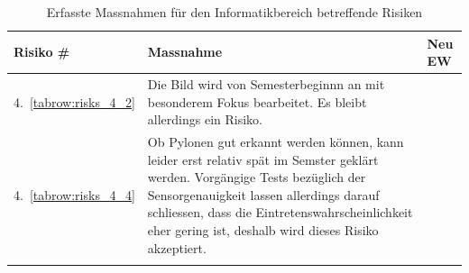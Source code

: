 \documentclass[main.tex]{subfiles} %
\begin{document}
\begin{table}[H]
    \begin{tabularx}{\textwidth}{|>{\centering\arraybackslash}p{2cm}|>{\raggedright\arraybackslash}X|>{\centering\arraybackslash}p{0.75cm}|}
        \hline
        \textbf{Risiko \#}        & \textbf{Massnahme}
                                  & \textbf{Neu EW}                                                                                                                                                                                                                                                                    \\
        \hline
        \rowcolor{yellow!30}
        4.~\ref{tabrow:risks_4_2} & Die Bild wird von Semesterbeginnn an mit besonderem Fokus bearbeitet. Es bleibt allerdings ein Risiko.
                                  & 2                                                                                                                                                                                                                                                                                  \\
        \hline
        \rowcolor{yellow!30}
        4.~\ref{tabrow:risks_4_4} & Ob Pylonen gut erkannt werden können, kann leider erst relativ spät im Semster geklärt werden. Vorgängige Tests bezüglich der Sensorgenauigkeit lassen allerdings darauf schliessen, dass die Eintretenswahrscheinlichkeit eher gering ist, deshalb wird dieses Risiko akzeptiert.
                                  & 2                                                                                                                                                                                                                                                                                  \\
        \hline
        \\
        \hline
    \end{tabularx}
    \caption{Erfasste Massnahmen für den Informatikbereich betreffende Risiken}~\label{tab:Erfasste_Massnahmen_info}
\end{table}
\end{document}
